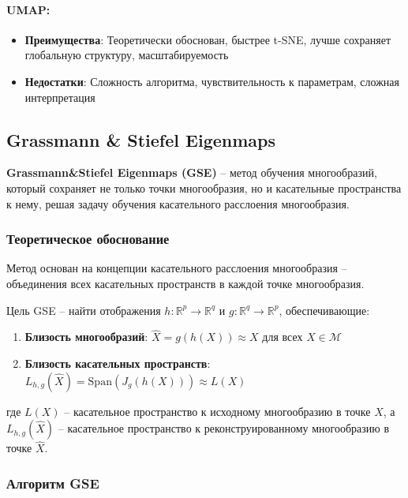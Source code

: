 \documentclass[a4paper,12pt]{article}
\begin{document}
\paragraph{UMAP:}
\begin{itemize}
    \item \textbf{Преимущества}: Теоретически обоснован, быстрее t-SNE, лучше сохраняет глобальную структуру, масштабируемость
    \item \textbf{Недостатки}: Сложность алгоритма, чувствительность к параметрам, сложная интерпретация
\end{itemize}

\subsection{Grassmann \& Stiefel Eigenmaps}

\textbf{Grassmann\&Stiefel Eigenmaps (GSE)} -- метод обучения многообразий, который сохраняет не только точки многообразия, но и касательные пространства к нему, решая задачу обучения касательного расслоения многообразия.

\subsubsection{Теоретическое обоснование}

Метод основан на концепции касательного расслоения многообразия -- объединения всех касательных пространств в каждой точке многообразия.

Цель GSE -- найти отображения $h: \mathbb{R}^p \rightarrow \mathbb{R}^q$ и $g: \mathbb{R}^q \rightarrow \mathbb{R}^p$, обеспечивающие:
\begin{enumerate}
    \item \textbf{Близость многообразий}: $\hat{X} = g(h(X)) \approx X$ для всех $X \in \mathcal{M}$
    \item \textbf{Близость касательных пространств}: $L_{h,g}(\hat{X}) = \text{Span}(J_g(h(X))) \approx L(X)$
\end{enumerate}

где $L(X)$ -- касательное пространство к исходному многообразию в точке $X$, а $L_{h,g}(\hat{X})$ -- касательное пространство к реконструированному многообразию в точке $\hat{X}$.

\subsubsection{Алгоритм GSE}
\end{document}
